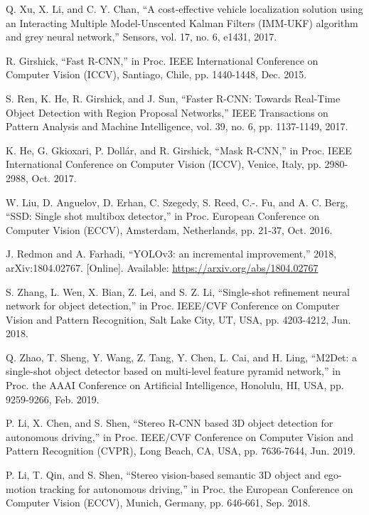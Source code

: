 \documentclass{ieeeaccess}
\begin{document}
\begin{thebibliography}{00}
 Q. Xu, X. Li, and C. Y. Chan, ``A cost-effective vehicle localization solution using an Interacting Multiple Model-Unscented Kalman Filters (IMM-UKF) algorithm and grey neural network,'' Sensors, vol. 17, no. 6, e1431, 2017.

 R. Girshick, ``Fast R-CNN,'' in Proc. IEEE International Conference on Computer Vision (ICCV), Santiago, Chile, pp. 1440-1448, Dec. 2015.

 S. Ren, K. He, R. Girshick, and J. Sun, ``Faster R-CNN: Towards Real-Time Object Detection with Region Proposal Networks,'' IEEE Transactions on Pattern Analysis and Machine Intelligence, vol. 39, no. 6, pp. 1137-1149, 2017.

 K. He, G. Gkioxari, P. Dollár, and R. Girshick, ``Mask R-CNN,'' in Proc. IEEE International Conference on Computer Vision (ICCV), Venice, Italy, pp. 2980-2988, Oct. 2017.

 W. Liu, D. Anguelov, D. Erhan, C. Szegedy, S. Reed, C.-. Fu, and A. C. Berg, ``SSD: Single shot multibox detector,'' in Proc. European Conference on Computer Vision (ECCV), Amsterdam, Netherlands, pp. 21-37, Oct. 2016.

 J. Redmon and A. Farhadi, ``YOLOv3: an incremental improvement,'' 2018, arXiv:1804.02767. [Online]. Available: \underline{https://arxiv.org/abs/1804.02767}

 S. Zhang, L. Wen, X. Bian, Z. Lei, and S. Z. Li, ``Single-shot refinement neural network for object detection,'' in Proc. IEEE/CVF Conference on Computer Vision and Pattern Recognition, Salt Lake City, UT, USA, pp. 4203-4212, Jun. 2018.

 Q. Zhao, T. Sheng, Y. Wang, Z. Tang, Y. Chen, L. Cai, and H. Ling, ``M2Det: a single-shot object detector based on multi-level feature pyramid network,'' in Proc. the AAAI Conference on Artificial Intelligence, Honolulu, HI, USA, pp. 9259-9266, Feb. 2019.

 P. Li, X. Chen, and S. Shen, ``Stereo R-CNN based 3D object detection for autonomous driving,'' in Proc. IEEE/CVF Conference on Computer Vision and Pattern Recognition (CVPR), Long Beach, CA, USA, pp. 7636-7644, Jun. 2019.

 P. Li, T. Qin, and S. Shen, ``Stereo vision-based semantic 3D object and ego-motion tracking for autonomous driving,'' in Proc. the European Conference on Computer Vision (ECCV),  Munich, Germany, pp. 646-661, Sep. 2018. 


\end{thebibliography}
\end{document}
